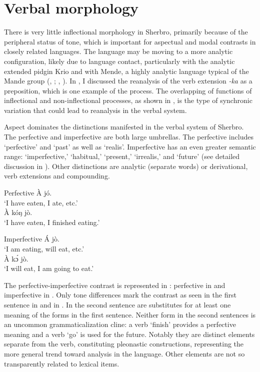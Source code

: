 \chapter{Verbal morphology}
\label{ch:4}\hypertarget{Toc115517781}{}
There is very little inflectional morphology in Sherbro, primarily because of the peripheral status of tone, which is important for aspectual and modal contrasts in closely related languages. The language may be moving to a more analytic configuration, likely due to language contact, particularly with the analytic extended pidgin Krio and with Mende, a highly analytic language typical of the Mande group (\citealt{Dwyer1989}, \citealt{Dwyer1998}; \citealt{Vydrin2004}, \citealt{Vydrin2012}). In , I discussed the reanalysis of the verb extension \textit{{}-ka} as a preposition, which is one example of the process. The overlapping of functions of inflectional and non-inflectional processes, as shown in , is the type of synchronic variation that could lead to reanalysis in the verbal system.

Aspect dominates the distinctions manifested in the verbal system of Sherbro. The perfective and imperfective are both large umbrellas. The perfective includes ‘perfective' and ‘past' as well as ‘realis'. Imperfective has an even greater semantic range: ‘imperfective,' ‘habitual,' ‘present,' ‘irrealis,' and ‘future' (see detailed discussion in \citealt{Corcoraninprep}). Other distinctions are analytic (separate words) or derivational, verb extensions and compounding.

\ea%
    \label{ex:109}
    \ea \label{ex:109a} Perfective 
    \ea À jó.\\
    ‘I have eaten, I ate, etc.'\\ 
  
    \ex À kóŋ jò.\\
    ‘I have eaten, I finished eating.'\\
    \z
  
    \ex \label{ex:109b} Imperfective
    \ea Á jò.\\
    ‘I am eating, will eat, etc.'\\
    
    \ex À kɔ́ jò.\\ 
    ‘I will eat, I am going to eat.'
\z
\z
\z

The perfective-imperfective contrast is represented in : perfective in   and imperfective in . Only tone differences mark the contrast as seen in the first sentence in  and in . In the second sentence are substitutes for at least one meaning of the forms in the first sentence. Neither form in the second sentences is an uncommon grammaticalization cline: a verb ‘finish' provides a perfective meaning and a verb ‘go' is used for the future. Notably they are distinct elements separate from the verb, constituting pleonastic constructions, representing the more general trend toward analysis in the language. Other elements are not so transparently related to lexical items.


